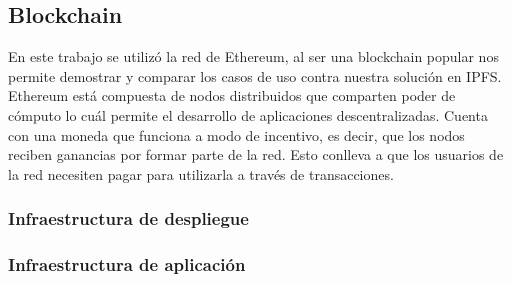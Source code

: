 \subsection{Blockchain}

En este trabajo se utilizó la red de Ethereum, al ser una blockchain popular nos permite demostrar y comparar los casos de uso contra nuestra solución en IPFS. Ethereum está compuesta de nodos distribuidos que comparten poder de cómputo lo cuál permite el desarrollo de aplicaciones descentralizadas. Cuenta con una moneda que funciona a modo de incentivo, es decir, que los nodos reciben ganancias por formar parte de la red. Esto conlleva a que los usuarios de la red necesiten pagar para utilizarla a través de transacciones.

\subsubsection{Infraestructura de despliegue}




\subsubsection{Infraestructura de aplicación}
